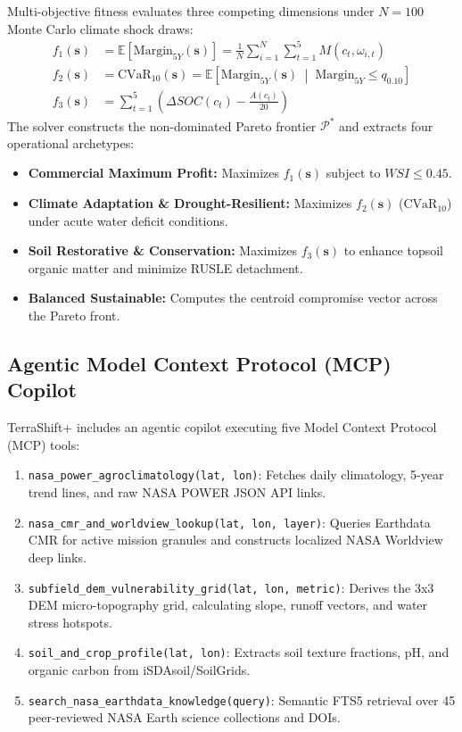 \documentclass[10pt,twocolumn]{article}
\begin{document}
Multi-objective fitness evaluates three competing dimensions under $N=100$ Monte Carlo climate shock draws:
\begin{align}
f_1(\mathbf{s}) &= \mathbb{E}[\text{Margin}_{5Y}(\mathbf{s})] = \frac{1}{N}\sum_{i=1}^N \sum_{t=1}^5 M(c_t, \omega_{i,t}) \\
f_2(\mathbf{s}) &= \text{CVaR}_{10}(\mathbf{s}) = \mathbb{E}\left[\text{Margin}_{5Y}(\mathbf{s}) \;\middle|\; \text{Margin}_{5Y} \le q_{0.10}\right] \\
f_3(\mathbf{s}) &= \sum_{t=1}^5 \left( \Delta SOC(c_t) - \frac{A(c_t)}{20} \right)
\end{align}
The solver constructs the non-dominated Pareto frontier $\mathcal{P}^*$ and extracts four operational archetypes:
\begin{itemize}[leftmargin=*]
  \item \textbf{Commercial Maximum Profit:} Maximizes $f_1(\mathbf{s})$ subject to $WSI \le 0.45$.
  \item \textbf{Climate Adaptation \& Drought-Resilient:} Maximizes $f_2(\mathbf{s})$ ($\text{CVaR}_{10}$) under acute water deficit conditions.
  \item \textbf{Soil Restorative \& Conservation:} Maximizes $f_3(\mathbf{s})$ to enhance topsoil organic matter and minimize RUSLE detachment.
  \item \textbf{Balanced Sustainable:} Computes the centroid compromise vector across the Pareto front.
\end{itemize}

\subsection{Agentic Model Context Protocol (MCP) Copilot}
TerraShift+ includes an agentic copilot executing five Model Context Protocol (MCP) tools:
\begin{enumerate}[leftmargin=*]
  \item \texttt{nasa\_power\_agroclimatology(lat, lon)}: Fetches daily climatology, 5-year trend lines, and raw NASA POWER JSON API links.
  \item \texttt{nasa\_cmr\_and\_worldview\_lookup(lat, lon, layer)}: Queries Earthdata CMR for active mission granules and constructs localized NASA Worldview deep links.
  \item \texttt{subfield\_dem\_vulnerability\_grid(lat, lon, metric)}: Derives the 3x3 DEM micro-topography grid, calculating slope, runoff vectors, and water stress hotspots.
  \item \texttt{soil\_and\_crop\_profile(lat, lon)}: Extracts soil texture fractions, pH, and organic carbon from iSDAsoil/SoilGrids.
  \item \texttt{search\_nasa\_earthdata\_knowledge(query)}: Semantic FTS5 retrieval over 45 peer-reviewed NASA Earth science collections and DOIs.
\end{enumerate}
\end{document}
